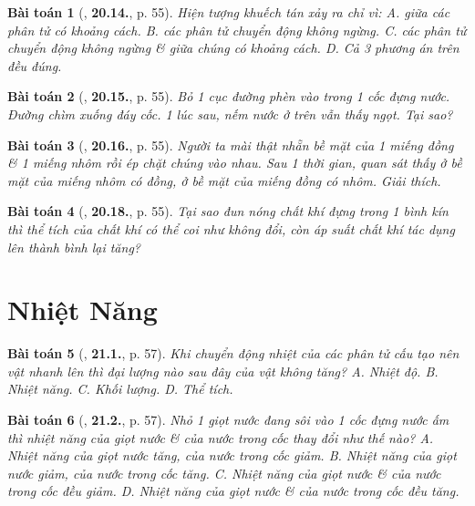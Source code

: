 \documentclass{article}
\numberwithin{equation}{section}
\newtheorem{baitoan}{Bài toán}
\begin{document}
\begin{baitoan}[\cite{SBT_Vat_Ly_8}, \textbf{20.14.}, p. 55]
	Hiện tượng khuếch tán xảy ra chỉ vì: {\sf A.} giữa các phân tử có khoảng cách. {\sf B.} các phân tử chuyển động không ngừng. {\sf C.} các phân tử chuyển động không ngừng \& giữa chúng có khoảng cách. {\sf D.} Cả 3 phương án trên đều đúng.
\end{baitoan}

\begin{baitoan}[\cite{SBT_Vat_Ly_8}, \textbf{20.15.}, p. 55]
	Bỏ 1 cục đường phèn vào trong 1 cốc đựng nước. Đường chìm xuống đáy cốc. 1 lúc sau, nếm nước ở trên vẫn thấy ngọt. Tại sao?
\end{baitoan}

\begin{baitoan}[\cite{SBT_Vat_Ly_8}, \textbf{20.16.}, p. 55]
	Người ta mài thật nhẵn bề mặt của 1 miếng đồng \& 1 miếng nhôm rồi ép chặt chúng vào nhau. Sau 1 thời gian, quan sát thấy ở bề mặt của miếng nhôm có đồng, ở bề mặt của miếng đồng có nhôm. Giải thích.
\end{baitoan}

\begin{baitoan}[\cite{SBT_Vat_Ly_8}, \textbf{20.18.}, p. 55]
	Tại sao đun nóng chất khí đựng trong 1 bình kín thì thể tích của chất khí có thể coi như không đổi, còn áp suất chất khí tác dụng lên thành bình lại tăng?
\end{baitoan}


\section{Nhiệt Năng}

\begin{baitoan}[\cite{SBT_Vat_Ly_8}, \textbf{21.1.}, p. 57]
	Khi chuyển động nhiệt của các phân tử cấu tạo nên vật nhanh lên thì đại lượng nào sau đây của vật không tăng? {\sf A.} Nhiệt độ. {\sf B.} Nhiệt năng. {\sf C.} Khối lượng. {\sf D.} Thể tích.
\end{baitoan}

\begin{baitoan}[\cite{SBT_Vat_Ly_8}, \textbf{21.2.}, p. 57]
	Nhỏ 1 giọt nước đang sôi vào 1 cốc đựng nước ấm thì nhiệt năng của giọt nước \& của nước trong cốc thay đổi như thế nào? {\sf A.} Nhiệt năng của giọt nước tăng, của nước trong cốc giảm. {\sf B.} Nhiệt năng của giọt nước giảm, của nước trong cốc tăng. {\sf C.} Nhiệt năng của giọt nước \& của nước trong cốc đều giảm. {\sf D.} Nhiệt năng của giọt nước \& của nước trong cốc đều tăng.
\end{baitoan}
\end{document}
